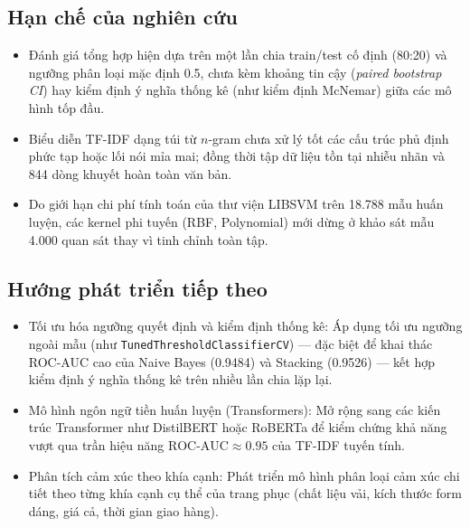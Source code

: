 \subsection{Hạn chế của nghiên cứu}
\begin{itemize}
    \item Đánh giá tổng hợp hiện dựa trên một lần chia train/test cố định (80:20) và ngưỡng phân loại mặc định 0.5, chưa kèm khoảng tin cậy (\textit{paired bootstrap CI}) hay kiểm định ý nghĩa thống kê (như kiểm định McNemar) giữa các mô hình tốp đầu.
    \item Biểu diễn TF-IDF dạng túi từ $n$-gram chưa xử lý tốt các cấu trúc phủ định phức tạp hoặc lối nói mỉa mai; đồng thời tập dữ liệu tồn tại nhiễu nhãn và 844 dòng khuyết hoàn toàn văn bản.
    \item Do giới hạn chi phí tính toán của thư viện LIBSVM trên 18.788 mẫu huấn luyện, các kernel phi tuyến (RBF, Polynomial) mới dừng ở khảo sát mẫu 4.000 quan sát thay vì tinh chỉnh toàn tập.
\end{itemize}

\subsection{Hướng phát triển tiếp theo}
\begin{itemize}
    \item Tối ưu hóa ngưỡng quyết định và kiểm định thống kê: Áp dụng tối ưu ngưỡng ngoài mẫu (như \texttt{TunedThreshold\allowbreak ClassifierCV}) — đặc biệt để khai thác ROC-AUC cao của Naive Bayes (0.9484) và Stacking (0.9526) — kết hợp kiểm định ý nghĩa thống kê trên nhiều lần chia lặp lại.
    \item Mô hình ngôn ngữ tiền huấn luyện (Transformers): Mở rộng sang các kiến trúc Transformer \cite{vaswani2017} như DistilBERT \cite{sanh2019distilbert} hoặc RoBERTa \cite{liu2019roberta} để kiểm chứng khả năng vượt qua trần hiệu năng $\text{ROC-AUC} \approx 0.95$ của TF-IDF tuyến tính.
    \item Phân tích cảm xúc theo khía cạnh: Phát triển mô hình phân loại cảm xúc chi tiết theo từng khía cạnh cụ thể của trang phục (chất liệu vải, kích thước form dáng, giá cả, thời gian giao hàng).
\end{itemize}

